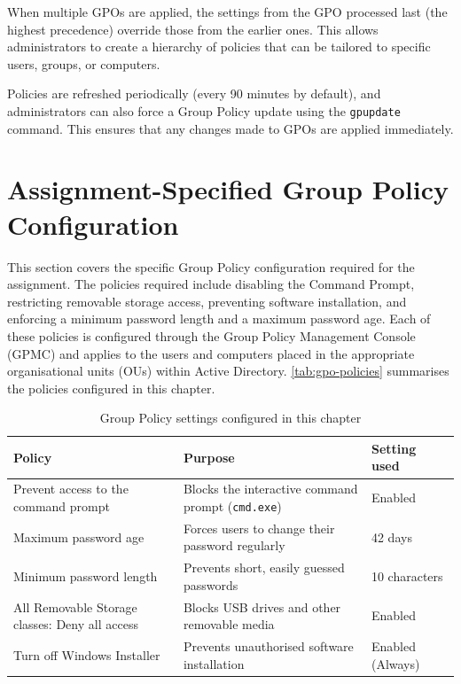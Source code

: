When multiple GPOs are applied, the settings from the GPO processed last (the highest precedence) override those from the earlier ones. This allows administrators to create a hierarchy of policies that can be tailored to specific users, groups, or computers.

Policies are refreshed periodically (every 90 minutes by default), and administrators can also force a Group Policy update using the \texttt{gpupdate} command. This ensures that any changes made to GPOs are applied immediately.

\section{Assignment-Specified Group Policy Configuration}
\label{sec:gpo-spec}
This section covers the specific Group Policy configuration required for the assignment. The policies required include disabling the Command Prompt, restricting removable storage access, preventing software installation, and enforcing a minimum password length and a maximum password age. Each of these policies is configured through the Group Policy Management Console (GPMC) and applies to the users and computers placed in the appropriate organisational units (OUs) within Active Directory. \autoref{tab:gpo-policies} summarises the policies configured in this chapter.

\begin{table}[H]
  \centering
  \small\sffamily
  \renewcommand{\arraystretch}{1.3}
  \begin{tabular}{@{}p{5.2cm}p{5.6cm}p{3.3cm}@{}}
    \toprule
    \textbf{Policy} & \textbf{Purpose} & \textbf{Setting used} \\
    \midrule
    Prevent access to the command prompt & Blocks the interactive command prompt (\texttt{cmd.exe}) & Enabled \\
    Maximum password age & Forces users to change their password regularly & 42 days \\
    Minimum password length & Prevents short, easily guessed passwords & 10 characters \\
    All Removable Storage classes: Deny all access & Blocks USB drives and other removable media & Enabled \\
    Turn off Windows Installer & Prevents unauthorised software installation & Enabled (Always) \\
    \bottomrule
  \end{tabular}
  \caption{Group Policy settings configured in this chapter}\label{tab:gpo-policies}
\end{table}


